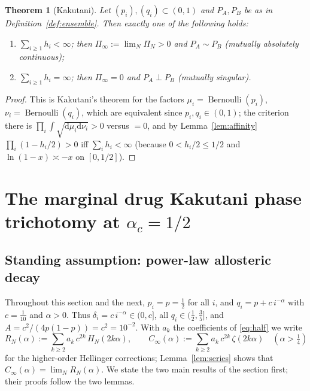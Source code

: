 \documentclass[11pt,reqno]{amsart}
\theoremstyle{plain}
\newtheorem{theorem}{Theorem}[section]
\theoremstyle{definition}
\theoremstyle{remark}
\numberwithin{equation}{section}
\DeclareMathOperator{\Bern}{Bernoulli}
\newcommand{\dd}{\mathrm{d}}
\newcommand{\PA}{P_{A}}
\newcommand{\PB}{P_{B}}
\begin{document}
\begin{theorem}[Kakutani]\label{thm:kakutani}
Let $(p_i),(q_i)\subset(0,1)$ and $\PA,\PB$ be as in Definition~\ref{def:ensemble}. Then exactly one of the following holds:
\begin{enumerate}[label=\textup{(\roman*)}]
\item $\sum_{i\ge1}h_i<\infty$; then $\Pi_\infty:=\lim_N\Pi_N>0$ and $\PA\sim\PB$ (mutually absolutely continuous);
\item $\sum_{i\ge1}h_i=\infty$; then $\Pi_\infty=0$ and $\PA\perp\PB$ (mutually singular).
\end{enumerate}
\end{theorem}

\begin{proof}
This is Kakutani's theorem \cite{Kakutani1948} for the factors $\mu_i=\Bern(p_i)$, $\nu_i=\Bern(q_i)$, which are equivalent since $p_i,q_i\in(0,1)$; the criterion there is $\prod_i\int\sqrt{\dd\mu_i\dd\nu_i}>0$ versus $=0$, and by Lemma~\ref{lem:affinity} $\prod_i(1-h_i/2)>0$ iff $\sum_ih_i<\infty$ (because $0<h_i/2\le1/2$ and $\ln(1-x)\asymp-x$ on $[0,1/2]$).
\end{proof}

\section{The marginal drug Kakutani phase trichotomy at \texorpdfstring{$\alpha_c=1/2$}{alpha\_c=1/2}}
\label{sec:trichotomy}

\subsection*{Standing assumption: power-law allosteric decay}
Throughout this section and the next, $p_i=p=\tfrac12$ for all $i$, and $q_i=p+c\,i^{-\alpha}$ with $c=\tfrac1{10}$ and $\alpha>0$. Thus $\delta_i=c\,i^{-\alpha}\in(0,c]$, all $q_i\in(\tfrac12,\tfrac35]$, and $A=c^2/(4p(1-p))=c^2=10^{-2}$. With $a_k$ the coefficients of \eqref{eq:half} we write
\begin{equation}\label{eq:RC}
R_N(\alpha):=\sum_{k\ge2}a_k\,c^{2k}\,H_N(2k\alpha),\qquad C_\infty(\alpha):=\sum_{k\ge2}a_k\,c^{2k}\,\zeta(2k\alpha)\quad(\alpha>\tfrac14)
\end{equation}
for the higher-order Hellinger corrections; Lemma~\ref{lem:series} shows that $C_\infty(\alpha)=\lim_NR_N(\alpha)$. We state the two main results of the section first; their proofs follow the two lemmas.
\end{document}
